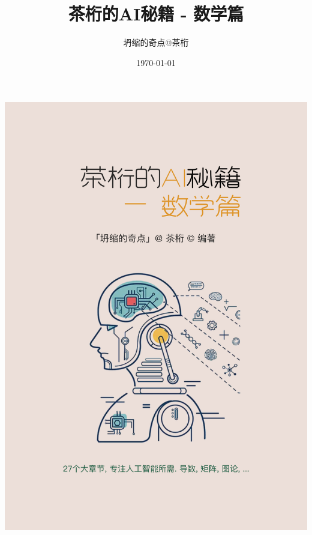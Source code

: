 \documentclass[oneside]{book}
\title{茶桁的AI秘籍 - 数学篇}
\author{坍缩的奇点@茶桁}
\date{\today}
\begin{document}

\begin{titlepage}
  \centering
  \includegraphics[width=\textwidth,height=\textheight, keepaspectratio]{Ebook_Cover-Math.png}
\end{titlepage}


\tableofcontents




























\end{document}
